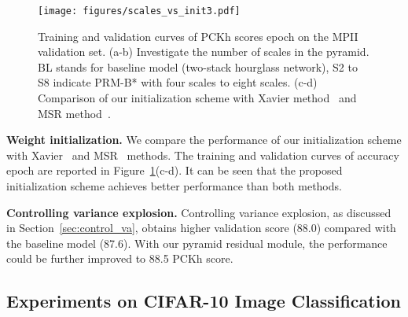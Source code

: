 \documentclass[10pt,twocolumn,letterpaper]{article}
\newcommand{\smalltitle}[1]{\vspace{0.2em}\noindent \textbf{{#1}}}
\begin{document}
\begin{figure}
	\begin{center}
		\texttt{[image: figures/scales\_vs\_init3.pdf]}
	\end{center}
	\vspace{-1em}
	\caption{ Training and validation curves of PCKh scores \vs epoch on the MPII validation set. (a-b) Investigate the number of scales in the pyramid. BL stands for baseline model (two-stack hourglass network), S2 to S8 indicate PRM-B* with four scales to eight scales. 
	(c-d) Comparison of our initialization scheme with Xavier method~\cite{glorot2010understanding} and MSR method~\cite{he2015delving}. }
	\label{fig:scales_and_initialization}
	\vspace{-1.2em}
\end{figure}

\smalltitle{Weight initialization.} 
We compare the performance of our initialization scheme with Xavier~\cite{glorot2010understanding} and MSR~\cite{he2015delving} methods. 
The training and validation curves of accuracy \vs epoch are reported in Figure~\ref{fig:scales_and_initialization}(c-d). 
It can be seen that the proposed initialization scheme achieves better performance than both methods. 







\smalltitle{Controlling variance explosion.} 
Controlling variance explosion, as discussed in Section~\ref{sec:control_va}, obtains higher validation score (88.0) compared with the baseline model (87.6). With our pyramid residual module, the performance could be further improved to 88.5 PCKh score.




\subsection{Experiments on CIFAR-10 Image Classification}
\end{document}
